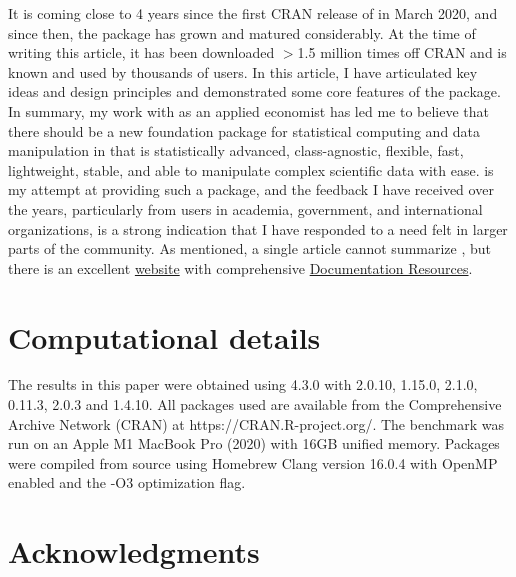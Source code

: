 \documentclass[article]{jss}
\begin{document}
It is coming close to 4 years since the first CRAN release of  in March 2020, and since then, the package has grown and matured considerably. At the time of writing this article, it has been downloaded $>$1.5 million times off CRAN and is known and used by thousands of  users. In this article, I have articulated key ideas and design principles and demonstrated some core features of the package. In summary, my work with  as an applied economist has led me to believe that there should be a new foundation package for statistical computing and data manipulation in  that is statistically advanced, class-agnostic, flexible, fast, lightweight, stable, and able to manipulate complex scientific data with ease.  is my attempt at providing such a package, and the feedback I have received over the years, particularly from users in academia, government, and international organizations, is a strong indication that I have responded to a need felt in larger parts of the  community. As mentioned, a single article cannot summarize , but there is an excellent \href{https://sebkrantz.github.io/collapse/index.html}{website} with comprehensive \href{https://sebkrantz.github.io/collapse/articles/collapse_documentation.html}{Documentation Resources}.



\section*{Computational details}
The results in this paper were obtained using  \citep{R} 4.3.0 with  2.0.10,  1.15.0,  2.1.0,  0.11.3,  \citep{rmagrittr} 2.0.3 and  \citep{rmicrobenchmark} 1.4.10. All packages used are available from the Comprehensive  Archive Network (CRAN) at https://CRAN.R-project.org/. The benchmark was run on an Apple M1 MacBook Pro (2020) with 16GB unified memory. Packages were compiled from source using Homebrew Clang version 16.0.4 with OpenMP enabled and the -O3 optimization flag.

\section*{Acknowledgments}
\end{document}
